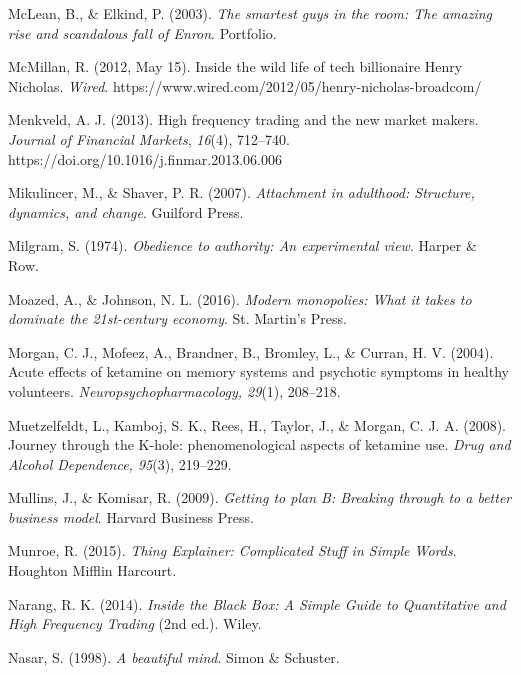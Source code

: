 \begin{thebibliography}{}
    McLean, B., \& Elkind, P. (2003). \textit{The smartest guys in the room: The amazing rise and scandalous fall of Enron}. Portfolio.

    McMillan, R. (2012, May 15). Inside the wild life of tech billionaire Henry Nicholas. \textit{Wired}. https://www.wired.com/2012/05/henry-nicholas-broadcom/

    Menkveld, A. J. (2013). High frequency trading and the new market makers. \textit{Journal of Financial Markets}, \textit{16}(4), 712–740. https://doi.org/10.1016/j.finmar.2013.06.006

    Mikulincer, M., \& Shaver, P. R. (2007). \textit{Attachment in adulthood: Structure, dynamics, and change}. Guilford Press.

    Milgram, S. (1974). \textit{Obedience to authority: An experimental view}. Harper \& Row.

    Moazed, A., \& Johnson, N. L. (2016). \textit{Modern monopolies: What it takes to dominate the 21st-century economy}. St. Martin’s Press.

    Morgan, C. J., Mofeez, A., Brandner, B., Bromley, L., \& Curran, H. V. (2004). Acute effects of ketamine on memory systems and psychotic symptoms in healthy volunteers. \textit{Neuropsychopharmacology, 29}(1), 208–218.

    Muetzelfeldt, L., Kamboj, S. K., Rees, H., Taylor, J., \& Morgan, C. J. A. (2008). Journey through the K-hole: phenomenological aspects of ketamine use. \textit{Drug and Alcohol Dependence, 95}(3), 219–229.

    Mullins, J., \& Komisar, R. (2009). \textit{Getting to plan B: Breaking through to a better business model}. Harvard Business Press.

    Munroe, R. (2015). \textit{Thing Explainer: Complicated Stuff in Simple Words}. Houghton Mifflin Harcourt.


    Narang, R. K. (2014). \textit{Inside the Black Box: A Simple Guide to Quantitative and High Frequency Trading} (2nd ed.). Wiley.

    Nasar, S. (1998). \textit{A beautiful mind}. Simon \& Schuster.


\end{thebibliography}
